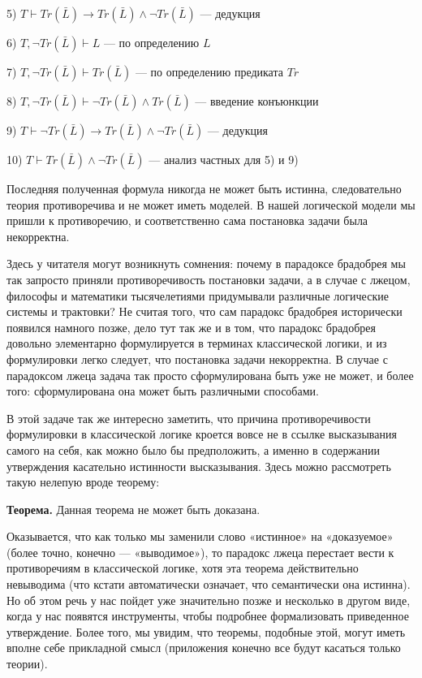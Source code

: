 5) $T\vdash Tr(\bar{L})\rightarrow Tr(\bar{L})\wedge\neg Tr(\bar{L})$ — дедукция

6) $T, \neg Tr(\bar{L})\vdash L$ — по определению $L$

7) $T, \neg Tr(\bar{L}) \vdash Tr(\bar{L})$ — по определению предиката $Tr$

8) $T, \neg Tr(\bar{L})\vdash \neg Tr(\bar{L}) \wedge Tr(\bar{L})$ — введение конъюнкции

9) $T\vdash \neg Tr(\bar{L})\rightarrow Tr(\bar{L})\wedge\neg Tr(\bar{L})$ — дедукция

10) $T\vdash Tr(\bar{L})\wedge\neg Tr(\bar{L})$ — анализ частных для 5) и 9)

Последняя полученная формула никогда не может быть истинна, следовательно теория противоречива и не может иметь моделей. В нашей логической модели мы пришли к противоречию, и соответственно сама постановка задачи была некорректна.

Здесь у читателя могут возникнуть сомнения: почему в парадоксе брадобрея мы так запросто приняли противоречивость постановки задачи, а в случае с лжецом, философы и математики тысячелетиями придумывали различные логические системы и трактовки? Не считая того, что сам парадокс брадобрея исторически появился намного позже, дело тут так же и в том, что парадокс брадобрея довольно элементарно формулируется в терминах классической логики, и из формулировки легко следует, что постановка задачи некорректна. В случае с парадоксом лжеца задача так просто сформулирована быть уже не может, и более того: сформулирована она может быть различными способами.

В этой задаче так же интересно заметить, что причина противоречивости формулировки в классической логике кроется вовсе не в ссылке высказывания самого на себя, как можно было бы предположить, а именно в содержании утверждения касательно истинности высказывания. Здесь можно рассмотреть такую нелепую вроде теорему:

{\bfseries Теорема.} Данная теорема не может быть доказана.

Оказывается, что как только мы заменили слово «истинное» на «доказуемое» (более точно, конечно — «выводимое»), то парадокс лжеца перестает вести к противоречиям в классической логике, хотя эта теорема действительно невыводима (что кстати автоматически означает, что семантически она истинна). Но об этом речь у нас пойдет уже значительно позже и несколько в другом виде, когда у нас появятся инструменты, чтобы подробнее формализовать приведенное утверждение. Более того, мы увидим, что теоремы, подобные этой, могут иметь вполне себе прикладной смысл (приложения конечно все будут касаться только теории).
